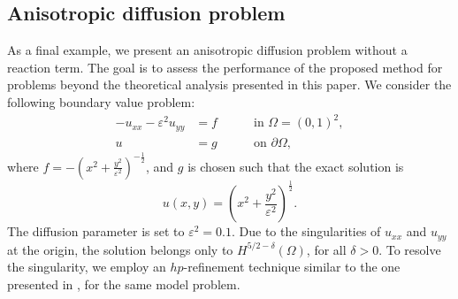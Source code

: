 \documentclass[a4paper,twoside,10pt]{article}
\newenvironment{eqs} %
 { \begin{equation} \begin{aligned} } %
 { \end{aligned} \end{equation} \ignorespacesafterend } %
\newcommand{\eps}{\varepsilon}
\numberwithin{equation}{section}
\begin{document}
\subsection{Anisotropic diffusion problem}\label{sec:anisotropicdiffusion}
As a final example, we present an anisotropic diffusion problem  without a reaction term.  
The goal is to assess the performance of the proposed method
for problems beyond the theoretical analysis presented in this paper.
We consider the following boundary value problem:
\begin{eqs}\label{eq:diffmatrix}
	-u_{xx}- \eps^2 u_{yy} &= f\quad &&\text{ in } \Omega=(0,1)^2, \\
	u &= g \quad &&\text{ on } \partial\Omega,
\end{eqs}
	where $f=-\left(x^2+\frac{y^2}{\eps^2}\right)^{-\frac12}$, and $g$ is chosen such that the exact solution is
\begin{equation}\label{eq:solmatrixdiff}
	u(x,y)=\left(x^2+\frac{y^2}{\eps^2}\right)^\frac12.
\end{equation}
The diffusion parameter is set to $\eps^2=0.1$. 
Due to the singularities of $u_{xx}$ and $u_{yy}$ at the origin, the solution belongs only to $H^{5/2-\delta}(\Omega)$, for all $\delta>0$.
To resolve the singularity, we employ an $hp$-refinement technique similar to the one presented in \cite[\S 4.3.5]{G03dm}, for the same model problem.
\end{document}
